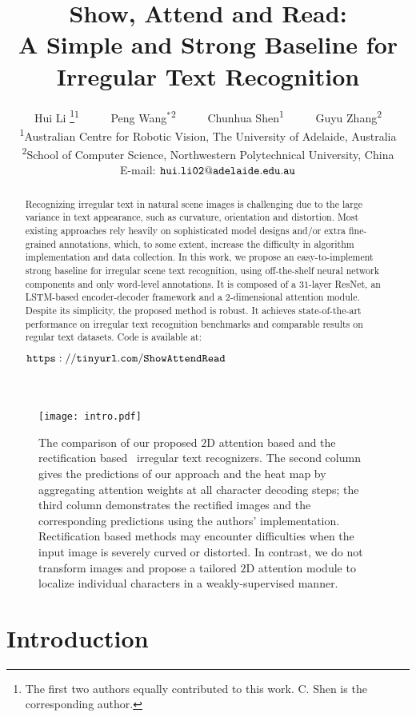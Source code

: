 \documentclass[letterpaper]{article} \usepackage{aaai19}  \usepackage{times}  \usepackage{helvet}  \usepackage{courier}  \usepackage{url}  \usepackage{graphicx}  \usepackage{amsmath}
\title{Show, Attend and Read: \\ A Simple and Strong Baseline for Irregular Text Recognition}
\author{
	Hui Li \thanks{The first two authors equally contributed to this work. C. Shen is the corresponding author.
}\textsuperscript{\rm 1}
	~ ~ ~ Peng Wang$^{\ast}$\textsuperscript{\rm 2}
	~ ~ ~ Chunhua Shen\textsuperscript{\rm 1}
	~ ~ ~ Guyu Zhang\textsuperscript{\rm 2} \\
	\textsuperscript{\rm 1}Australian Centre for Robotic Vision, The University of Adelaide, Australia\\
	\textsuperscript{\rm 2}School of Computer Science,  Northwestern Polytechnical University, China \\
	E-mail: $\tt hui.li02@adelaide.edu.au$
}
\begin{document}
\maketitle
\begin{abstract}

Recognizing irregular text in natural scene images is challenging due to the large variance in text appearance, such as curvature, orientation and distortion.
Most existing approaches rely heavily on sophisticated model designs and/or extra fine-grained annotations, which, to some extent, increase the difficulty in algorithm implementation and data collection.
In this work, we propose an easy-to-implement strong baseline for irregular scene text recognition, using off-the-shelf neural network components and only word-level annotations. It is composed of a $31$-layer ResNet, an LSTM-based encoder-decoder framework and a 2-dimensional attention module.
Despite its simplicity, the proposed method is robust. It achieves state-of-the-art performance on irregular text recognition benchmarks and comparable results on regular text datasets.
Code is available at:

	{$\tt https://tinyurl.com/ShowAttendRead$}
\end{abstract}

\begin{figure}[t!]
	\begin{center}
		\texttt{[image: intro.pdf]}
	\end{center}
	\caption{ The comparison of our proposed $2$D attention based and the rectification based~\cite{shiPAMI2018} irregular text recognizers.
	    The second column gives the predictions of our approach and
		the heat map by aggregating attention weights at all character decoding steps;
		the third column demonstrates the rectified images and the corresponding predictions using the authors' implementation.
		Rectification based methods may encounter difficulties when the input image is severely curved or distorted.
		In contrast, we do not transform images and propose a tailored $2$D attention module to localize individual characters
		in a weakly-supervised manner.
	}
	\label{fig:intro}
\end{figure}

\section{Introduction}
\label{sec:intro}
\end{document}
